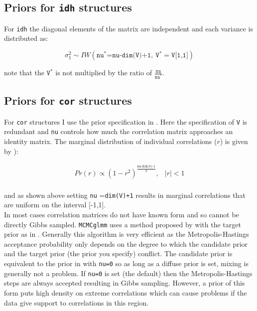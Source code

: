 \documentclass{article}
\begin{document}
\subsection{Priors for \texttt{idh} structures}

For \texttt{idh} the diagonal elements of the matrix are independent and each variance is distributed as:

\begin{displaymath}
\sigma^{2}_{1} \sim IW\left(\texttt{nu}^{\ast}\texttt{=nu-dim(V)+1},\ \texttt{V}^{\ast}=\texttt{V[1,1]}\right)
\end{displaymath}

note that the $\texttt{V}^{\ast}$ is not multiplied by the ratio of  $\frac{\texttt{nu}}{\texttt{nu}^{\ast}}$.

\subsection{Priors for \texttt{cor} structures}

For \texttt{cor} structures I use the prior specification in \citet{Barnard.2000}. Here the specification of \texttt{V} is redundant and \texttt{nu} controls how much the correlation matrix approaches an identity matrix.  The marginal distribution of individual correlations ($r$) is given by  \citep{Barnard.2000}   \citep[and][]{Box.1973}):

\begin{equation}
\begin{array}{lr}
Pr(r) \propto (1-r^{2})^\frac{\texttt{nu-dim(V)-1}}{\texttt{2}}, & |r|<1\\
\end{array}
\end{equation}

and as shown above setting \texttt{nu} =\texttt{dim(V)+1} results in marginal correlations that are uniform on the interval [-1,1].\\

In most cases correlation matrices do not have known form and so cannot be directly Gibbs sampled. \texttt{MCMCglmm} uses a method proposed by \citet{Liu.2006} with the target prior as in \citet{Barnard.2000}.  Generally this algorithm is very efficient as the Metropolis-Hastings acceptance probability only depends on the degree to which the candidate prior  and the target prior (the prior you specify) conflict. The candidate prior is equivalent to the prior  in \citet{Barnard.2000} with \texttt{nu=0} so as long as a diffuse prior is set, mixing is generally not a problem. If  \texttt{nu=0} is set (the default) then the Metropolis-Hastings steps are always accepted resulting in Gibbs sampling. However, a prior of this form puts high density on extreme correlations which can cause problems if the data give support to correlations in this region.\\ 


\ifalone


\end{document}
